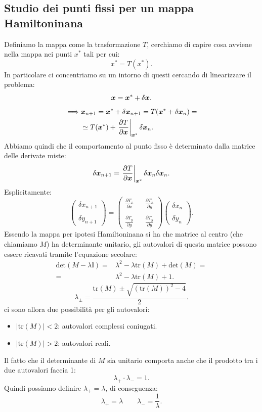 \subsection{Studio dei punti fissi per un mappa Hamiltoninana}%
\label{sub:Studio dei punti fissi per un mappa Hamiltoninana}
Definiamo la mappa come la trasformazione $T$, cerchiamo di capire cosa avviene nella mappa nei punti $x^*$ tali per cui:
\[
    x^* = T(x^*)
.\] 
In particolare ci concentriamo su un intorno di questi cercando di linearizzare il problema:
\[
    \boldsymbol{x} = \boldsymbol{x}^* + \delta\boldsymbol{x}
.\] 
\[\begin{aligned}
    \implies  & \boldsymbol{x}_{n+1} = \boldsymbol{x}^* + \delta\boldsymbol{x}_{n+1} = T(\boldsymbol{x}^* + \delta\boldsymbol{x}_n) = \\
	      & \simeq T(\boldsymbol{x}^*) + \left.\frac{\partial T}{\partial \boldsymbol{x}} \right|_{\boldsymbol{x}^*}\delta\boldsymbol{x}_n
.\end{aligned}\]
Abbiamo quindi che il comportamento al punto fisso è determinato dalla matrice delle derivate miste:
\[
    \delta\boldsymbol{x}_{n+1} = \left.\frac{\partial T}{\partial \boldsymbol{x}} \right|_{\boldsymbol{x}^*}\delta\boldsymbol{x}_n \delta\boldsymbol{x}_n
.\] 
Esplicitamente:
\[
    \begin{pmatrix} \delta x_{n+1} \\ \\ \delta y_{n+1} \end{pmatrix} = 
    \begin{pmatrix} 
	\frac{\partial T_x}{\partial x} && \frac{\partial T_x}{\partial y} \\
					&&\\
	\frac{\partial T_y}{\partial y} && \frac{\partial T_y}{\partial y} 
    \end{pmatrix} 
    \begin{pmatrix} \delta x_{n} \\ \\ \delta y_{n} \end{pmatrix} 
.\] 
Essendo la mappa per ipotesi Hamiltoninana si ha che matrice al centro (che chiamiamo $M$) ha determinante unitario, gli autovalori di questa matrice possono essere ricavati tramite l'equazione secolare:
\[\begin{aligned}
    \text{det}(M-\lambda\mathbb{I})=&\lambda^2-\lambda\text{tr}(M)+\text{det}(M) = \\
    =&\lambda^2-\lambda\text{tr}(M)+1
.\end{aligned}\]
\[
    \lambda_{\pm} = \frac{\text{tr}(M)\pm\sqrt{(\text{tr}(M))^2-4}}{2}
.\] 
ci sono allora due possibilità per gli autovalori:
\begin{itemize}
    \item $\left|\text{tr}(M)\right|<2$: autovalori complessi coniugati.
    \item $\left|\text{tr}(M)\right|>2$: autovalori reali.
\end{itemize}
Il fatto che il determinante di $M$ sia unitario comporta anche che il prodotto tra i due autovalori faccia 1:
\[
    \lambda_+\cdot \lambda_- = 1
.\] 
Quindi possiamo definire $\lambda_+ = \lambda$, di conseguenza:
\[
    \lambda_+ = \lambda  \qquad \lambda_- = \frac{1}{\lambda}
.\] 

